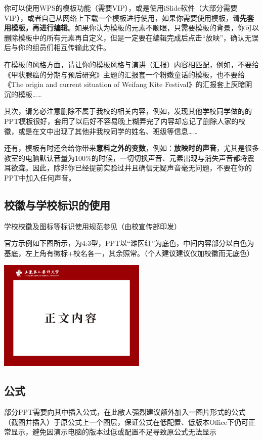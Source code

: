你可以使用WPS的模板功能（需要VIP），或是使用iSlide软件（大部分需要VIP），或者自己从网络上下载一个模板进行使用，如果你需要使用模板，请\textbf{先套用模板，再进行编辑}。如果你认为模板的元素不顺眼，只需要模板的背景，你可以删除模板中的所有元素再自定义，但是一定要在编辑完成后点击“放映”，确认无误后与你的组员们相互传输此文件。

在模板的风格方面，请让你的模板风格与演讲（汇报）内容相匹配，例如，不要给《甲状腺癌的分期与预后研究》主题的汇报套一个粉嫩童话的模板，也不要给《The origin and current situation of Weifang Kite Festival》的汇报套上灰暗阴沉的模板……

其次，请务必注意删除不属于我校的相关内容，例如，发现其他学校同学做的的PPT模板很好，套用了以后好不容易晚上糊弄完了内容却忘记了删除人家的校徽，或是在文中出现了其他非我校同学的姓名、班级等信息……

还有，模板有时还会给你带来\textbf{意料之外的变数}，例如：\textbf{放映时的声音}，尤其是很多教室的电脑默认音量为100\%的时候，一切切换声音、元素出现与消失声音都将震耳欲聋。因此，除非你已经提前实验过并且确信无疑声音毫无问题，不要在你的PPT中加入任何声音。

\subsection[校徽与学校标识的使用]{校徽与学校标识的使用}
学校校徽及图标等标识使用规范参见（由校宣传部印发）

官方示例如下图所示，为4:3型，PPT以“潍医红”\footnotemark 为底色，中间内容部分以白色为基底，左上角有徽标+校名各一，其余照常。（个人建议建议仅加校徽而无底色）

\begin{table}[H]
    \centering
    \includegraphics[height=200px]{ppt-内容.pdf}
\end{table}

\subsection[公式]{公式}
部分PPT需要向其中插入公式，在此敝人强烈建议额外加入一图片形式的公式（截图并插入）于原公式上一个图层，保证公式在低配置、低版本Office下仍可正常显示，避免因演示电脑的版本过低或配置不足导致原公式无法显示

